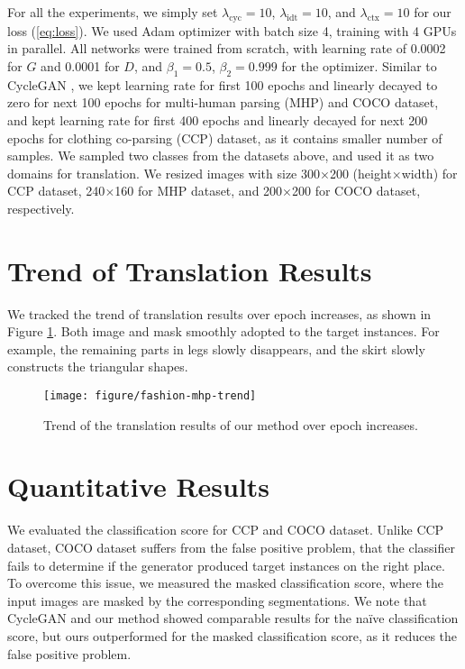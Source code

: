 \documentclass{article} \usepackage{iclr2019_conference,times}
\begin{document}
For all the experiments, we simply set $\lambda_\text{cyc} = 10$, $\lambda_\text{idt} = 10$, and $\lambda_\text{ctx} = 10$ for our loss (\ref{eq:loss}).
We used Adam \citep{kingma2014adam} optimizer with batch size 4, training with 4 GPUs in parallel.
All networks were trained from scratch, with learning rate of 0.0002 for $G$ and 0.0001 for $D$, and $\beta_1 = 0.5$, $\beta_2 = 0.999$ for the optimizer.
Similar to CycleGAN \citep{zhu2017unpaired}, we kept learning rate for first 100 epochs and linearly decayed to zero for next 100 epochs
for multi-human parsing (MHP) \citep{zhao2018understanding} and COCO \citep{lin2014microsoft} dataset,
and kept learning rate for first 400 epochs and linearly decayed for next 200 epochs
for clothing co-parsing (CCP) \citep{yang2014clothing} dataset, as it contains smaller number of samples.
We sampled two classes from the datasets above, and used it as two domains for translation.
We resized images with size 300$\times$200 (height$\times$width) for CCP dataset, 240$\times$160 for MHP dataset, and 200$\times$200 for COCO dataset, respectively.










\section{Trend of Translation Results}
\label{sec:epoch-trends}

We tracked the trend of translation results over epoch increases, as shown in Figure \ref{fig:fashion-mhp-trend}.
Both image and mask smoothly adopted to the target instances.
For example, the remaining parts in legs slowly disappears,
and the skirt slowly constructs the triangular shapes.

\begin{figure}[H]
	\centering
	\texttt{[image: figure/fashion-mhp-trend]}
	\caption{
	Trend of the translation results of our method over epoch increases.
} \label{fig:fashion-mhp-trend}
\end{figure}


\newpage
\section{Quantitative Results}
\label{sec:cls-score}



We evaluated the classification score for CCP and COCO dataset.
Unlike CCP dataset, COCO dataset suffers from the false positive problem,
that the classifier fails to determine if the generator produced target instances on the right place. To overcome this issue, we measured the masked classification score,
where the input images are masked by the corresponding segmentations.
We note that CycleGAN and our method showed comparable results for the na\"ive classification score,
but ours outperformed for the masked classification score, as it reduces the false positive problem.
\end{document}
